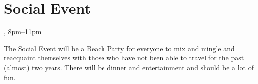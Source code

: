 \clearpage
\section{Social Event}
\setheaders{}{\daydateyear}

\begin{center}



\daydateyear, 8pm--11pm \vspace{1em}\\
\end{center}

The Social Event will be a Beach Party for everyone to mix and mingle and reacquaint themselves with those who
have not been able to travel for the past (almost) two years.
There will be dinner and entertainment and should be a lot of fun.
